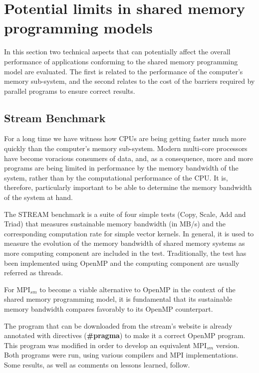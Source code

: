 \section{Potential limits in shared memory programming models}

In this section two technical aspects that can potentially affect the overall performance of applications conforming to the shared memory programming model are evaluated. The first is related to the performance of the computer's memory sub-system, and the second relates to the cost of the barriers required by parallel programs to ensure correct results.


\subsection*{Stream Benchmark}

For a long time we have witness how CPUs are being getting faster much more quickly than the computer's memory sub-system. Modern multi-core processors have become voracious consumers of data, and, as a consequence, more and more programs are being limited in performance by the memory bandwidth of the system, rather than by the computational performance of the CPU\cite{McCalpin2007}. It is, therefore, particularly important to be able to determine the memory bandwidth of the system at hand. 

\medskip


The STREAM benchmark\cite{McCalpin2007} is a suite of four simple tests (Copy, Scale, Add and Triad) that measures sustainable memory bandwidth (in MB/s) and the corresponding computation rate for simple vector kernels. In general, it is used to measure the evolution of the memory bandwidth of shared memory systems as more computing component are included in the test. Traditionally, the test has been implemented using OpenMP and the computing component are usually referred as threads.

\medskip

For MPI$_{sm}$ to become a viable alternative to OpenMP in the context of the shared memory programming model, it is fundamental that its sustainable memory bandwidth compares favorably to its OpenMP counterpart.

\medskip

The program that can be downloaded from the stream's website \cite{McCalpin2007} is already annotated with directives (\textbf{\#pragma}) to make it a correct OpenMP program. This program was modified in order to develop an equivalent  MPI$_{sm}$ version. Both programs were run, using various compilers and MPI implementations. Some results, as well as comments on lessons learned, follow.

